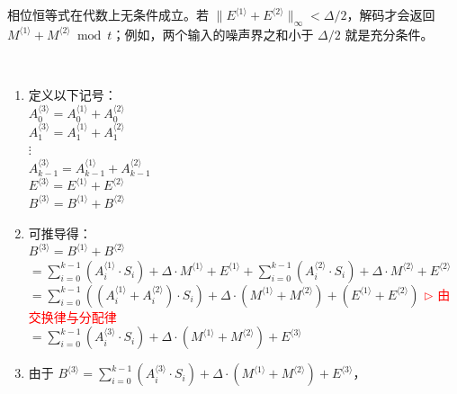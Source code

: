 相位恒等式在代数上无条件成立。若 $\|E^{\langle1\rangle}+E^{\langle2\rangle}\|_\infty<\Delta/2$，解码才会返回 $M^{\langle1\rangle}+M^{\langle2\rangle}\bmod t$；例如，两个输入的噪声界之和小于 $\Delta/2$ 就是充分条件。

$ $

\begin{myproof}
\begin{enumerate}
\item 定义以下记号： \\
$A_0^{\langle 3 \rangle} = A_0^{\langle 1 \rangle} + A_0^{\langle 2 \rangle}$ \\
$A_1^{\langle 3 \rangle} = A_1^{\langle 1 \rangle} + A_1^{\langle 2 \rangle}$ \\
$\vdots$ \\
$A_{k-1}^{\langle 3 \rangle} = A_{k-1}^{\langle 1 \rangle} + A_{k-1}^{\langle 2 \rangle}$ \\
$E^{\langle 3 \rangle} = E^{\langle 1 \rangle} + E^{\langle 2 \rangle}$ \\
$B^{\langle 3 \rangle} = B^{\langle 1 \rangle} + B^{\langle 2 \rangle}$
\item 可推导得： \\
$B^{\langle 3 \rangle} = B^{\langle 1 \rangle} + B^{\langle 2 \rangle}$ \\
$ = \sum\limits_{i=0}^{k-1}{(A_i^{\langle 1 \rangle} \cdot S_i)} + \Delta \cdot M^{\langle 1 \rangle} + E^{\langle 1 \rangle} + \sum\limits_{i=0}^{k-1}{(A_i^{\langle 2 \rangle} \cdot S_i)} + \Delta \cdot M^{\langle 2 \rangle} + E^{\langle 2 \rangle}$ \\ 
$= \sum\limits_{i=0}^{k-1}{((A_i^{\langle 1 \rangle} + A_i^{\langle 2 \rangle}) \cdot S_i)} + \Delta \cdot (M^{\langle 1 \rangle} + M^{\langle 2 \rangle}) + (E^{\langle 1 \rangle} + E^{\langle 2 \rangle})$ \textcolor{red}{ $\rhd$ 由交换律与分配律} \\
$= \sum\limits_{i=0}^{k-1}{(A_i^{\langle 3 \rangle} \cdot S_i)} + \Delta \cdot (M^{\langle 1 \rangle} + M^{\langle 2 \rangle}) + E^{\langle 3 \rangle}$ \\
\item 由于 $B^{\langle 3 \rangle} = \sum\limits_{i=0}^{k-1}{(A_i^{\langle 3 \rangle} \cdot S_i)} + \Delta \cdot (M^{\langle 1 \rangle} + M^{\langle 2 \rangle}) + E^{\langle 3 \rangle}$，


\end{enumerate}
\end{myproof}
